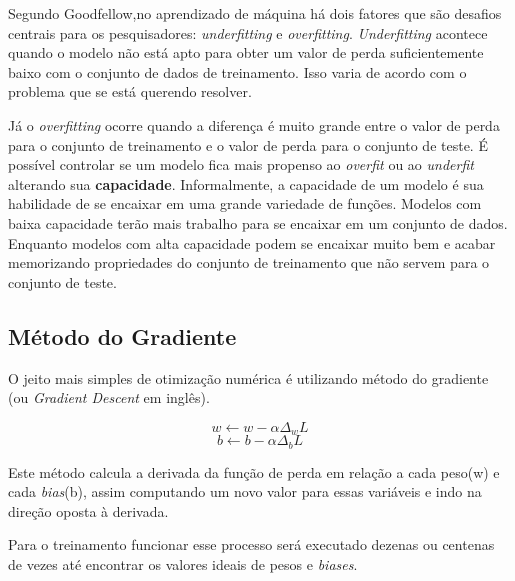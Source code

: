 Segundo Goodfellow\cite{Goodfellow-et-al-2016-Book},no aprendizado de
máquina há dois fatores que são desafios centrais para os
pesquisadores: \textit{underfitting} e
\textit{overfitting}. \textit{Underfitting} acontece quando o modelo
não está apto para obter um valor de perda suficientemente baixo com o
conjunto de dados de treinamento. Isso varia de acordo com o problema
que se está querendo resolver.

Já o \textit{overfitting} ocorre quando a diferença é muito grande
entre o valor de perda para o conjunto de treinamento e o valor de
perda para o conjunto de teste. É possível controlar se um modelo fica
mais propenso ao \textit{overfit} ou ao \textit{underfit} alterando
sua {\bf capacidade}. Informalmente, a capacidade de um modelo é sua
habilidade de se encaixar em uma grande variedade de funções. Modelos
com baixa capacidade terão mais trabalho para se encaixar em um
conjunto de dados. Enquanto modelos com alta capacidade podem se
encaixar muito bem e acabar memorizando propriedades do conjunto de
treinamento que não servem para o conjunto de teste.

\subsection{Método do Gradiente}

O jeito mais simples de otimização numérica é utilizando método do
gradiente (ou \textit{Gradient Descent} em inglês).

\begin{equation}
  w \leftarrow w - \alpha \Delta_w L
\end{equation}
\begin{equation}
  b \leftarrow b - \alpha \Delta_b L
\end{equation}

Este método calcula a derivada da função de perda em relação a cada
peso(w) e cada \textit{bias}(b), assim computando um novo valor para
essas variáveis e indo na direção oposta à derivada.

Para o treinamento funcionar esse processo será executado dezenas ou
centenas de vezes até encontrar os valores ideais de pesos e
\textit{biases}.

